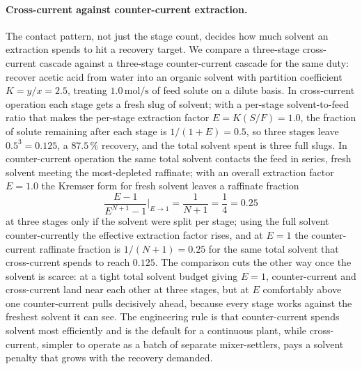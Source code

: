 \paragraph{Cross-current against counter-current extraction.} The contact
pattern, not just the stage count, decides how much solvent an extraction
spends to hit a recovery target. We compare a three-stage cross-current
cascade against a three-stage counter-current cascade for the same duty:
recover acetic acid from water into an organic solvent with partition
coefficient $K = y/x = 2.5$, treating $1.0\,\text{mol/s}$ of feed solute
on a dilute basis. In cross-current operation each stage gets a fresh
slug of solvent; with a per-stage solvent-to-feed ratio that makes the
per-stage extraction factor $E = K(S/F) = 1.0$, the fraction of solute
remaining after each stage is $1/(1+E) = 0.5$, so three stages leave
$0.5^3 = 0.125$, a $87.5\,\%$ recovery, and the total solvent spent is
three full slugs. In counter-current operation the same total solvent
contacts the feed in series, fresh solvent meeting the most-depleted
raffinate; with an overall extraction factor $E = 1.0$ the Kremser form
for fresh solvent leaves a raffinate fraction
\[
\frac{E - 1}{E^{N+1} - 1}\bigg|_{E\to 1} = \frac{1}{N+1} = \frac{1}{4} =
0.25
\]
at three stages only if the solvent were split per stage; using the full
solvent counter-currently the effective extraction factor rises, and at
$E = 1$ the counter-current raffinate fraction is $1/(N+1) = 0.25$ for the
same total solvent that cross-current spends to reach $0.125$. The
comparison cuts the other way once the solvent is scarce: at a tight total
solvent budget giving $E = 1$, counter-current and cross-current land near
each other at three stages, but at $E$ comfortably above one counter-current
pulls decisively ahead, because every stage works against the freshest
solvent it can see. The engineering rule is that counter-current spends
solvent most efficiently and is the default for a continuous plant, while
cross-current, simpler to operate as a batch of separate mixer-settlers,
pays a solvent penalty that grows with the recovery demanded.


